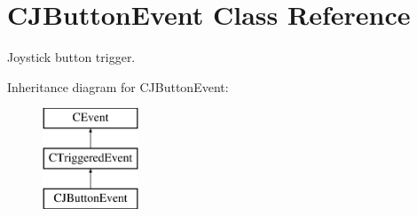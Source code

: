 \hypertarget{classCJButtonEvent}{\section{C\-J\-Button\-Event Class Reference}
\label{classCJButtonEvent}
}


Joystick button trigger.  


Inheritance diagram for C\-J\-Button\-Event\-:\begin{figure}[H]
\begin{center}
\leavevmode
\includegraphics[height=3.000000cm]{classCJButtonEvent}
\end{center}
\end{figure}
